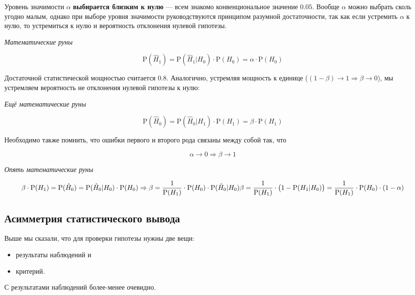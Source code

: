 \documentclass[
  letterpaper,
  DIV=11,
  numbers=noendperiod]{scrreprt}
\providecommand{\tightlist}{%
  \setlength{\itemsep}{0pt}\setlength{\parskip}{0pt}}\usepackage{longtable,booktabs,array}
\theoremstyle{definition}
\theoremstyle{remark}
\begin{document}
Уровень значимости \(\alpha\) \textbf{выбирается близким к нулю} ---
всем знакомо конвенциональное значение \(0.05\). Вообще \(\alpha\) можно
выбрать сколь угодно малым, однако при выборе уровня значимости
руководствуются принципом разумной достаточности, так как если устремить
\(\alpha\) к нулю, то устремиться к нулю и вероятность отклонения
нулевой гипотезы.

\emph{Математические руны}

\[
\mathrm P (\hat H_1) = \mathrm P (\hat H_1 | H_0) \cdot \mathrm P (H_0) = \alpha \cdot \mathrm P(H_0)
\]

Достаточной статистической мощностью считается \(0.8\). Аналогично,
устремляя мощность к единице
(\((1 - \beta) \rightarrow 1 \Rightarrow \beta \rightarrow 0\)), мы
устремляем вероятность не отклонения нулевой гипотезы к нулю:

\emph{Ещё математические руны}

\[
\mathrm P (\hat H_0) = \mathrm P (\hat H_0 | H_1) \cdot \mathrm P (H_1) = \beta \cdot \mathrm P (H_1)
\]

Необходимо также помнить, что ошибки первого и второго рода связаны
между собой так, что

\[
\alpha \rightarrow 0 \Rightarrow \beta \rightarrow 1
\]

\emph{Опять математические руны}

\[
\beta \cdot \mathrm P (H_1) = \mathrm P (\hat H_0) = \mathrm P (\hat H_0 | H_0) \cdot \mathrm P (H_0) \Rightarrow \beta = \frac{1}{\mathrm P (H_1)} \cdot \mathrm P (H_0) \cdot \mathrm P(\hat H_0 | H_0) \\
\beta = \frac{1}{\mathrm P (H_1)} \cdot \big (1 - \mathrm P (H_1 | H_0)\big) = \frac{1}{\mathrm P (H_1)} \cdot \mathrm P (H_0) \cdot (1 - \alpha)
\]

\subsection{Асимметрия статистического
вывода}\label{stats-testing-asymmetry}

Выше мы сказали, что для проверки гипотезы нужны две вещи:

\begin{itemize}
\tightlist
\item
  результаты наблюдений и
\item
  критерий.
\end{itemize}

С результатами наблюдений более-менее очевидно.
\end{document}
